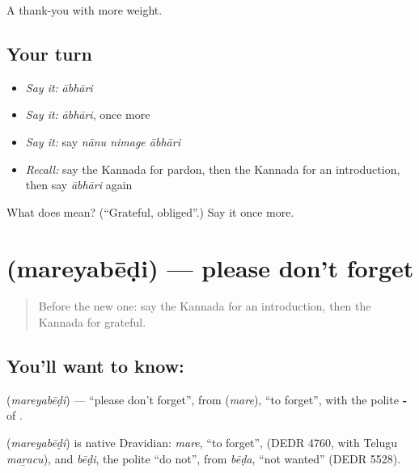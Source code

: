 \begin{grammarlens}[title={What you've built}]
A thank-you with more weight.
\end{grammarlens}

\subsection*{Your turn}
\begin{itemize}
\raggedright
  \item \emph{Say it:} \emph{ābhāri}
  \item \emph{Say it:} \emph{ābhāri}, once more
  \item \emph{Say it:} say \emph{nānu nimage ābhāri}
  \item \emph{Recall:} say the Kannada for pardon, then the Kannada for an introduction, then say \emph{ābhāri} again
\end{itemize}

\begin{tcolorbox}[breakable,colback=teal!4,colframe=teal!35!black,title={Before you move on}]
What does  mean? (\textquotedblleft{}Grateful, obliged\textquotedblright{}.) Say it once more.
\end{tcolorbox}
\section[\texorpdfstring{\kn{ಮರೆಯಬೇಡಿ} (mareyabēḍi)}{ಮರೆಯಬೇಡಿ (mareyabēḍi)}]{ (mareyabēḍi) — please don't forget}

\label{lesson:KA-C97-dontforget}



\begin{quote}
Before the new one: say the Kannada for an introduction, then the Kannada for grateful.
\end{quote}

\subsection*{You'll want to know: }
\textbf{} (\emph{mareyabēḍi}) — \textquotedblleft{}please don't forget\textquotedblright{}, from \textbf{} (\emph{mare}), \textquotedblleft{}to forget\textquotedblright{}, with the polite \textbf{‑} of \textbf{ }.

\begin{cousinweb}
\textbf{} (\emph{mareyabēḍi}) is native Dravidian: \emph{mare}, \textquotedblleft{}to forget\textquotedblright{}, (DEDR 4760, with Telugu \emph{maṟacu}), and \emph{bēḍi}, the polite \textquotedblleft{}do not\textquotedblright{}, from \emph{bēḍa}, \textquotedblleft{}not wanted\textquotedblright{} (DEDR 5528).
\end{cousinweb}

